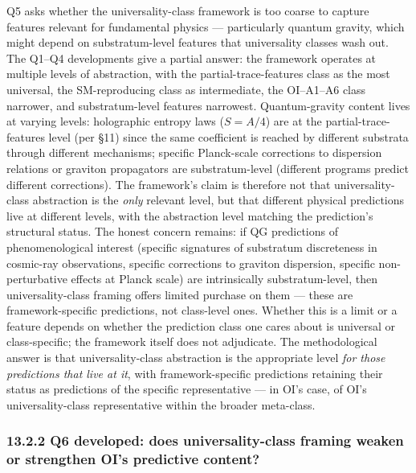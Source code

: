 \documentclass[
]{article}
\begin{document}
Q5 asks whether the universality-class framework is too coarse to
capture features relevant for fundamental physics --- particularly
quantum gravity, which might depend on substratum-level features that
universality classes wash out. The Q1--Q4 developments give a partial
answer: the framework operates at multiple levels of abstraction, with
the partial-trace-features class as the most universal, the
SM-reproducing class as intermediate, the OI--A1--A6 class narrower, and
substratum-level features narrowest. Quantum-gravity content lives at
varying levels: holographic entropy laws (\(S = A/4\)) are at the
partial-trace-features level (per §11) since the same coefficient is
reached by different substrata through different mechanisms; specific
Planck-scale corrections to dispersion relations or graviton propagators
are substratum-level (different programs predict different corrections).
The framework's claim is therefore not that universality-class
abstraction is the \emph{only} relevant level, but that different
physical predictions live at different levels, with the abstraction
level matching the prediction's structural status. The honest concern
remains: if QG predictions of phenomenological interest (specific
signatures of substratum discreteness in cosmic-ray observations,
specific corrections to graviton dispersion, specific non-perturbative
effects at Planck scale) are intrinsically substratum-level, then
universality-class framing offers limited purchase on them --- these are
framework-specific predictions, not class-level ones. Whether this is a
limit or a feature depends on whether the prediction class one cares
about is universal or class-specific; the framework itself does not
adjudicate. The methodological answer is that universality-class
abstraction is the appropriate level \emph{for those predictions that
live at it}, with framework-specific predictions retaining their status
as predictions of the specific representative --- in OI's case, of OI's
universality-class representative within the broader meta-class.

\hypertarget{q6-developed-does-universality-class-framing-weaken-or-strengthen-ois-predictive-content}{%
\subsubsection{13.2.2 Q6 developed: does universality-class framing
weaken or strengthen OI's predictive
content?}\label{q6-developed-does-universality-class-framing-weaken-or-strengthen-ois-predictive-content}}
\end{document}
